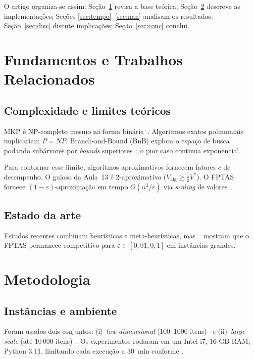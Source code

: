 \documentclass[10pt,a4paper]{article}
\begin{document}
\noindent O artigo organiza-se assim:
Seção~\ref{sec:fund} revisa a base teórica;
Seção~\ref{sec:met} descreve as implementações;
Seções \ref{sec:tempo}–\ref{sec:nan} analisam os resultados;
Seção~\ref{sec:disc} discute implicações;
Seção~\ref{sec:conc} conclui.

\section{Fundamentos e Trabalhos Relacionados}\label{sec:fund}
\subsection{Complexidade e limites teóricos}
MKP é NP-completo mesmo na forma binária~\cite{aula08}.  Algoritmos
exatos polinomiais implicariam $P=NP$.  Branch-and-Bound (BnB)
explora o espaço de busca podando subárvores por \emph{bounds}
superiores~\cite{aula12}; o pior caso continua exponencial.

Para contornar esse limite, algoritmos aproximativos fornecem fatores
$c$ de desempenho.  O guloso da Aula~13 é 2-aproximativo
($V_{\text{alg}}\ge \tfrac12V^*$).  O FPTAS fornece
$(1-\varepsilon)$-aproximação em tempo
$O(n^{3}/\varepsilon)$ via \textit{scaling} de valores~\cite{aula15}.

\subsection{Estado da arte}
Estudos recentes combinam heurísticas e meta-heurísticas, mas
\citeauthor{aula14}~\cite{aula14} mostram que o FPTAS permanece
competitivo para $\varepsilon\in[0{,}01,0{,}1]$ em instâncias grandes.

\section{Metodologia}\label{sec:met}
\subsection{Instâncias e ambiente}
Foram usados dois conjuntos:
(i)~\textit{low-dimensional} (100–1000 itens)~\cite{instancesLow} e
(ii)~\textit{large-scale} (até $10\,000$ itens)~\cite{instancesLarge}.
Os experimentos rodaram em um Intel i7, 16 GB RAM, Python 3.11,
limitando cada execução a \mbox{30 min} conforme
\cite{roteiro}.
\end{document}
